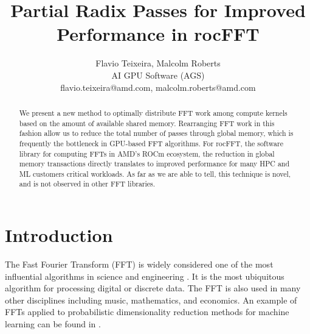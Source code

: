 \documentclass{gtac}
\title{Partial Radix Passes for Improved Performance in rocFFT \vspace{-0.7em}}
\author{Flavio Teixeira, Malcolm Roberts \\
AI GPU Software (AGS) \\
flavio.teixeira@amd.com, malcolm.roberts@amd.com} %
\theoremstyle{problemstyle}
\begin{document}
\maketitle %


\pagestyle{fancy}
\fancyhf{} %
\cfoot{\thepage} %
\renewcommand{\headrulewidth}{0pt} %

\thispagestyle{fancy}
\begin{abstract}

We present a new method to optimally distribute FFT work among compute
kernels based on the amount of available shared memory. Rearranging
FFT work in this fashion allow us to reduce the total number of passes
through global memory, which is frequently the bottleneck in GPU-based
FFT algorithms. For rocFFT, the software library for computing FFTs in
AMD's ROCm ecosystem, the reduction in global memory transactions
directly translates to improved performance for many HPC and ML
customers critical workloads.  As far as we are able to tell, this
technique is novel, and is not observed in other FFT libraries.

\end{abstract}


\section{Introduction}

The Fast Fourier Transform (FFT) is widely considered one of the most influential algorithms in science and engineering \cite{garravan00}. It is the most ubiquitous algorithm for processing digital or discrete data. The FFT is also used in many other disciplines including music, mathematics, and economics. An example of FFTs applied to probabilistic dimensionality reduction methods for machine learning can be found in \cite{nasseira20}.
\end{document}
